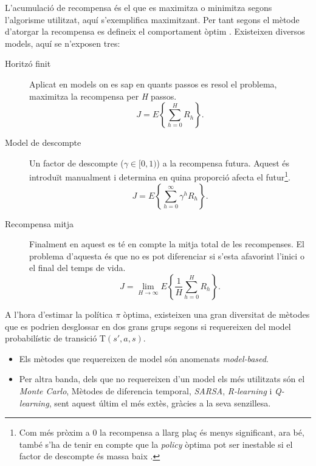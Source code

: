 \documentclass[12pt,a4paper,final,twoside]{report}
\begin{document}

L'acumulació de recompensa és el que es maximitza o minimitza segons l'algorisme utilitzat, aquí s'exemplifica maximitzant. Per tant segons el mètode d'atorgar la recompensa es defineix el comportament òptim \cite{Kober2009}. Existeixen diversos models, aquí se n'exposen tres:
\begin{description}


\item[Horitzó finit] Aplicat en models on es sap en quants passos es resol el problema, maximitza la recompensa per \textit{H} passos.
\begin{equation}
J=E\left\{ \sum_{h=0}^{H} R_{h} \right\}.
\end{equation}

\item[Model de descompte] Un factor de descompte ($\gamma\in[0,1)$) a la recompensa futura. Aquest és introduït manualment i determina en quina proporció afecta el futur\footnote{Com més pròxim a 0 la recompensa a llarg plaç és menys significant, ara bé, també s'ha de tenir en compte que la \textit{policy} òptima pot ser inestable si el factor de descompte és massa baix \cite{Kober2009}.}.
\begin{equation}
J=E\left\{ \sum_{h=0}^{\infty} \gamma^h R_{h} \right\}.
\end{equation}

\item[Recompensa mitja] Finalment en aquest es té en compte la mitja total de les recompenses. El problema d'aquesta és que no es pot diferenciar si s'esta afavorint l'inici o el final del temps de vida.
\begin{equation}
J=\lim_{H \to \infty} E\left\{ \frac{1}{H}\sum_{h=0}^{H} R_{h} \right\}.
\end{equation} 

\end{description}

A l'hora d'estimar la política $\pi$ òptima, existeixen una gran diversitat de mètodes que es podrien desglossar en dos grans grups segons si requereixen del model probabilístic de transició T$(s',a,s)$.

\begin{itemize}

\item Els mètodes que requereixen de model són anomenats \textit{model-based}.

\item Per altra banda, dels que no requereixen d'un model els més utilitzats són el \textit{Monte Carlo}, Mètodes de diferencia temporal, \textit{SARSA}, \textit{R-learning} i \textit{Q-learning}, sent aquest últim el més extès, gràcies a la seva senzillesa.

\end{itemize}
\end{document}
